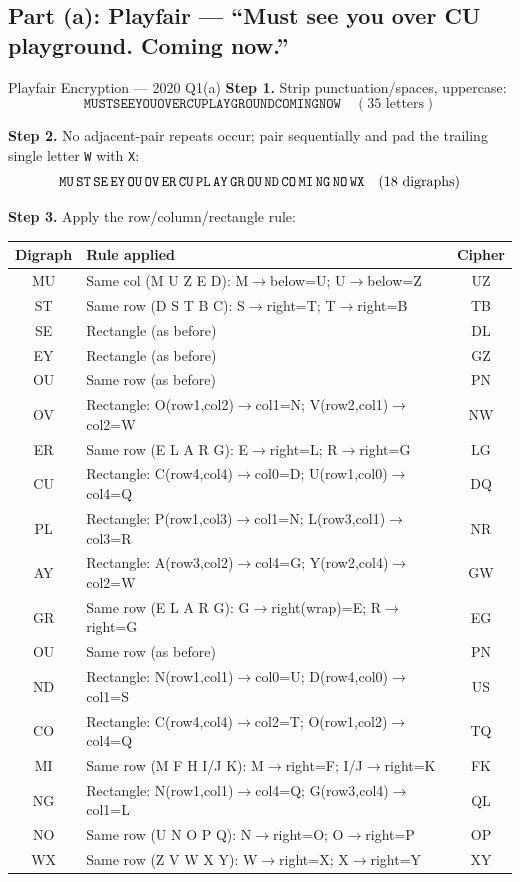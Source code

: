 \documentclass[12pt,a4paper]{article}
\begin{document}
\subsection{Part (a): Playfair --- ``Must see you over CU playground. Coming now.''}
\begin{solbox}{Playfair Encryption --- 2020 Q1(a)}
\textbf{Step 1.} Strip punctuation/spaces, uppercase:
\[ \texttt{MUSTSEEYOUOVERCUPLAYGROUNDCOMINGNOW} \quad (35 \text{ letters}) \]

\textbf{Step 2.} No adjacent-pair repeats occur; pair sequentially and pad the trailing single letter \texttt{W} with \texttt{X}:
\[ \texttt{MU\,ST\,SE\,EY\,OU\,OV\,ER\,CU\,PL\,AY\,GR\,OU\,ND\,CO\,MI\,NG\,NO\,WX} \quad (18\text{ digraphs}) \]

\textbf{Step 3.} Apply the row/column/rectangle rule:
\begin{center}
\renewcommand{\arraystretch}{1.25}
\begin{tabular}{c|l|c}
\toprule
Digraph & Rule applied & Cipher \\
\midrule
MU & Same col (M U Z E D): M$\to$below=U; U$\to$below=Z & UZ \\
ST & Same row (D S T B C): S$\to$right=T; T$\to$right=B & TB \\
SE & Rectangle (as before) & DL \\
EY & Rectangle (as before) & GZ \\
OU & Same row (as before) & PN \\
OV & Rectangle: O(row1,col2)$\to$col1=N; V(row2,col1)$\to$col2=W & NW \\
ER & Same row (E L A R G): E$\to$right=L; R$\to$right=G & LG \\
CU & Rectangle: C(row4,col4)$\to$col0=D; U(row1,col0)$\to$col4=Q & DQ \\
PL & Rectangle: P(row1,col3)$\to$col1=N; L(row3,col1)$\to$col3=R & NR \\
AY & Rectangle: A(row3,col2)$\to$col4=G; Y(row2,col4)$\to$col2=W & GW \\
GR & Same row (E L A R G): G$\to$right(wrap)=E; R$\to$right=G & EG \\
OU & Same row (as before) & PN \\
ND & Rectangle: N(row1,col1)$\to$col0=U; D(row4,col0)$\to$col1=S & US \\
CO & Rectangle: C(row4,col4)$\to$col2=T; O(row1,col2)$\to$col4=Q & TQ \\
MI & Same row (M F H I/J K): M$\to$right=F; I/J$\to$right=K & FK \\
NG & Rectangle: N(row1,col1)$\to$col4=Q; G(row3,col4)$\to$col1=L & QL \\
NO & Same row (U N O P Q): N$\to$right=O; O$\to$right=P & OP \\
WX & Same row (Z V W X Y): W$\to$right=X; X$\to$right=Y & XY \\
\bottomrule
\end{tabular}
\end{center}


\end{solbox}
\end{document}
